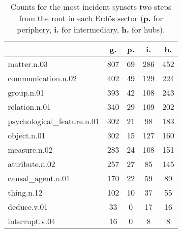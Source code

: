 \begin{table}[h!]
\begin{center}
\begin{tabular}{| l || c | c | c | c |}\hline
 & {\bf g.} & {\bf p.} & {\bf i.} & {\bf h.} \\\hline\hline
matter.n.03 & 807  & 69  & 286  & 452 \\\hline
communication.n.02 & 402  & 49  & 129  & 224 \\\hline
group.n.01 & 393  & 42  & 108  & 243 \\\hline
relation.n.01 & 340  & 29  & 109  & 202 \\\hline
psychological\_feature.n.01 & 302  & 21  & 98  & 183 \\\hline
object.n.01 & 302  & 15  & 127  & 160 \\\hline
measure.n.02 & 283  & 24  & 108  & 151 \\\hline
attribute.n.02 & 257  & 27  & 85  & 145 \\\hline
causal\_agent.n.01 & 170  & 22  & 59  & 89 \\\hline
thing.n.12 & 102  & 10  & 37  & 55 \\\hline
deduce.v.01 & 33  & 0  & 17  & 16 \\\hline
interrupt.v.04 & 16  & 0  & 8  & 8 \\\hline
\end{tabular}
\caption{Counts for the most incident synsets two steps from the root in each Erd\"os sector ({{\bf p.}} for periphery, {{\bf i.}} for intermediary, {{\bf h.}} for hubs).}
\end{center}
\end{table}
